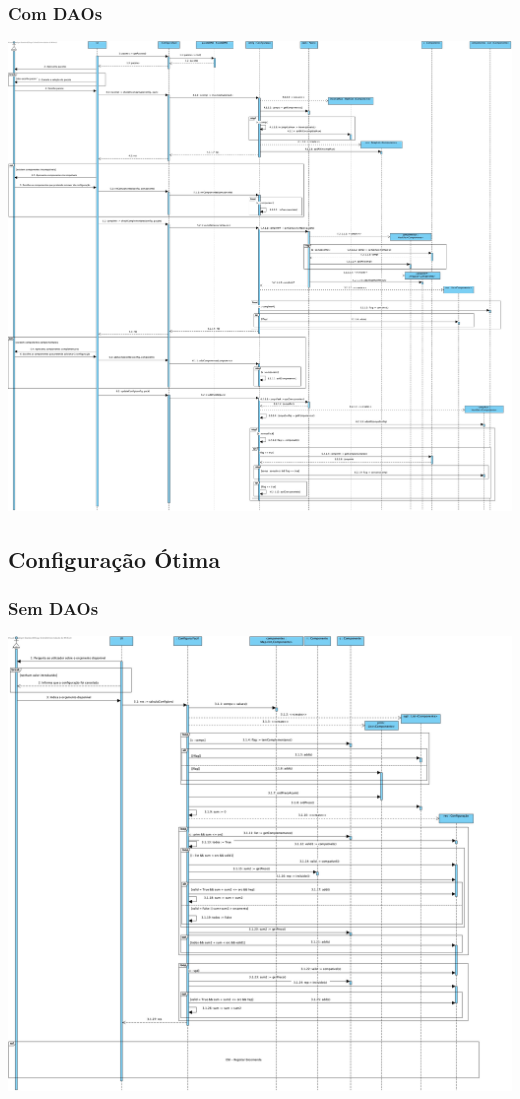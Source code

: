 \subsubsection{Com DAOs}
\begin{center}
 	\includegraphics[width = 5.5in]{DSI_D/DSI-DAOs-Adicionar_Pacote.jpg}
\end{center}


\subsection{Configuração Ótima}
\subsubsection{Sem DAOs}
\begin{center}
 	\includegraphics[width = 5.5in]{DSI/DSI-Configuracao_Otima.jpg}
\end{center}
